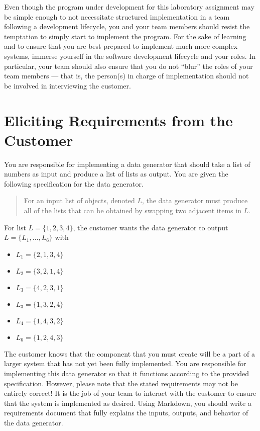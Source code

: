 Even though the program under development for this laboratory assignment may be simple enough to not necessitate
structured implementation in a team following a development lifecycle, you and your team members should resist the
temptation to simply start to implement the program. For the sake of learning and to ensure that you are best prepared
to implement much more complex systems, immerse yourself in the software development lifecycle and your roles. In
particular, your team should also ensure that you do not ``blur'' the roles of your team members --- that is, the
person(s) in charge of implementation should not be involved in interviewing the customer.

\section*{Eliciting Requirements from the Customer}

You are responsible for implementing a data generator that should take a list of numbers as input and produce a list of
lists as output.  You are given the following specification for the data generator.

\begin{quote}
For an input list of objects, denoted $L$, the data generator must produce all of the lists that can be obtained by swapping two
adjacent items in $L$.
\end{quote}

\noindent
For list $L = \{1, 2, 3, 4\}$, the customer wants the data generator to output $L=\{L_1, \ldots, L_6\}$ with

\begin{itemize}
  \itemsep 0in
  \item[] $L_1 = \{2, 1, 3, 4\}$
  \item[] $L_2 = \{3, 2, 1, 4\}$
  \item[] $L_3 = \{4, 2, 3, 1\}$
  \item[] $L_3 = \{1, 3, 2, 4\}$
  \item[] $L_4 = \{1, 4, 3, 2\}$
  \item[] $L_6 = \{1, 2, 4, 3\}$
\end{itemize}

The customer knows that the component that you must create will be a part of a larger system that has not yet been
fully implemented.  You are responsible for implementing this data generator so that it functions according to the
provided specification.  However, please note that the stated requirements may not be entirely correct!  It is the job
of your team to interact with the customer to ensure that the system is implemented as desired.  Using Markdown, you
should write a requirements document that fully explains the inputs, outputs, and behavior of the data generator.

